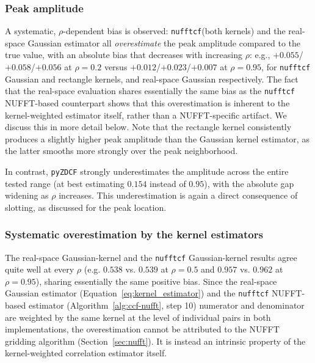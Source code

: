 \documentclass[twocolumn,10pt]{article}
\newcommand{\nufftcf}{\texttt{nufftcf}\xspace}
\newcommand{\pyzdcf}{\texttt{pyZDCF}\xspace}
\begin{document}
\subsubsection{Peak amplitude}
%
A systematic, $\rho$-dependent bias is observed: \nufftcf (both kernels) and
the real-space Gaussian estimator all \emph{overestimate} the peak amplitude
compared to the true value, with an absolute bias that decreases with
increasing $\rho$: e.g., $+0.055$/$+0.058$/$+0.056$ at $\rho=0.2$ versus
$+0.012$/$+0.023$/$+0.007$ at $\rho=0.95$, for \nufftcf Gaussian and rectangle kernels, and real-space Gaussian respectively. The fact that 
the real-space evaluation shares essentially the same bias as the \nufftcf 
NUFFT-based counterpart shows that this overestimation is inherent 
to the kernel-weighted estimator itself, rather than a NUFFT-specific artifact. 
We discuss this in more detail below. Note that the rectangle kernel consistently
produces a slightly higher peak amplitude than the Gaussian kernel
estimator, as the latter smooths more strongly over the peak neighborhood.

In contrast, \pyzdcf strongly underestimates the amplitude across the entire
tested range (at best estimating $0.154$ instead of $0.95$), with the
absolute gap widening as $\rho$ increases. This underestimation is again a
direct consequence of slotting, as discussed for the peak location.
%
\subsubsection{Systematic overestimation by the kernel estimators}
\label{sec:overestimation_peak_ampl}
%
The real-space Gaussian-kernel
and the \texttt{nufftcf} Gaussian-kernel results agree quite well at every $\rho$ (e.g. 
 $0.538$ vs. $0.539$ at $\rho=0.5$ and $0.957$ vs. $0.962$ at
$\rho=0.95$), sharing essentially the
same positive bias. Since the real-space Gaussian estimator (Equation~\ref{eq:kernel_estimator}) and 
the \nufftcf NUFFT-based estimator (Algorithm~\ref{alg:ccf-nufft}, step 10) numerator and denominator
 are weighted by the same kernel at the level of individual pairs in
both implementations, the overestimation cannot be attributed to the  NUFFT
gridding algorithm (Section~\ref{sec:nufft}). It is instead an intrinsic property of the
kernel-weighted correlation estimator itself.
\end{document}
